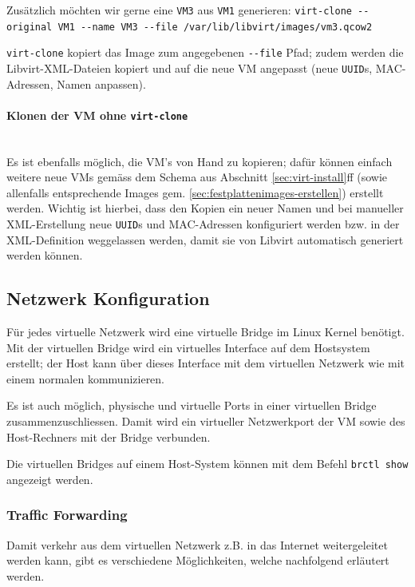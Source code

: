 Zusätzlich möchten wir gerne eine \lstinline|VM3| aus \lstinline|VM1| generieren: \lstinline|virt-clone --original VM1 --name VM3 --file /var/lib/libvirt/images/vm3.qcow2|

\lstinline|virt-clone| kopiert das Image zum angegebenen \lstinline|--file| Pfad; zudem werden die Libvirt-XML-Dateien kopiert und auf die neue VM angepasst (neue \lstinline|UUID|s, MAC-Adressen, Namen anpassen).

\paragraph{Klonen der VM ohne \lstinline|virt-clone|} \hfill \\
Es ist ebenfalls möglich, die VM's von Hand zu kopieren; dafür können einfach weitere neue VMs gemäss dem Schema aus Abschnitt \ref{sec:virt-install}ff (sowie allenfalls entsprechende Images gem. \ref{sec:festplattenimages-erstellen}) erstellt werden. Wichtig ist hierbei, dass den Kopien ein neuer Namen und bei manueller XML-Erstellung neue \lstinline|UUID|s und MAC-Adressen konfiguriert werden bzw. in der XML-Definition weggelassen werden, damit sie von Libvirt automatisch generiert werden können.


\subsection{Netzwerk Konfiguration}
Für jedes virtuelle Netzwerk wird eine virtuelle Bridge im Linux Kernel benötigt. Mit der virtuellen Bridge wird ein virtuelles Interface auf dem Hostsystem erstellt; der Host kann über dieses Interface mit dem virtuellen Netzwerk wie mit einem normalen kommunizieren.

Es ist auch möglich, physische und virtuelle Ports in einer virtuellen Bridge zusammenzuschliessen. Damit wird ein virtueller Netzwerkport der VM sowie des Host-Rechners mit der Bridge verbunden.

Die virtuellen Bridges auf einem Host-System können mit dem Befehl \lstinline|brctl show| angezeigt werden.

\subsubsection{Traffic Forwarding}
Damit verkehr aus dem virtuellen Netzwerk z.B. in das Internet weitergeleitet werden kann, gibt es verschiedene Möglichkeiten, welche nachfolgend erläutert werden.

